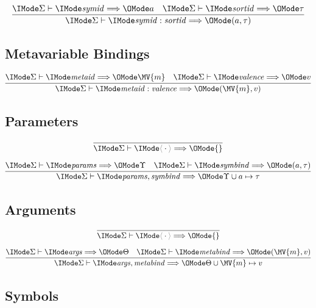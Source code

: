 \begin{gather}
  \infer{
    \Elab{\Sigma}{\ProdBind{\SortSymId}{\SortSortId}}{(a, \tau)}
  }{
    \Elab{\Sigma}{\SortSymId}{a} &
    \Elab{\Sigma}{\SortSortId}{\tau}
  }
\end{gather}

\subsection*{Metavariable Bindings\hfill {}}

\begin{gather}
  \infer{
    \Elab{\Sigma}{\ProdBind{\SortMetaId}{\SortValence}}{(\MV{m}, v)}
  }{
    \Elab{\Sigma}{\SortMetaId}{\MV{m}} &
    \Elab{\Sigma}{\SortValence}{v}
  }
\end{gather}

\subsection*{Parameters\hfill \framebox{$\Elab{\Sigma}{\SortParams}{\Upsilon}$}}

\begin{gather}
  \infer{
    \Elab{\Sigma}{\ProdEmptyCtx}{\{\}}
  }{
  }\\[6pt]
  \infer{
    \Elab{\Sigma}{\ProdExtendCtx{\SortParams}{\SortSymBind}}{
      \Upsilon\cup{a \mapsto\tau}
    }
  }{
    \Elab{\Sigma}{\SortParams}{\Upsilon} &
    \Elab{\Sigma}{\SortSymBind}{(a, \tau)}
  }
\end{gather}

\subsection*{Arguments\hfill \framebox{$\Elab{\Sigma}{\SortArgs}{\Theta}$}}

\begin{gather}
  \infer{
    \Elab{\Sigma}{\ProdEmptyCtx}{\{\}}
  }{
  }\\[6pt]
  \infer{
    \Elab{\Sigma}{\ProdExtendCtx{\SortArgs}{\SortMetaBind}}{
      \Theta\cup{\MV{m} \mapsto v}
    }
  }{
    \Elab{\Sigma}{\SortArgs}{\Theta} &
    \Elab{\Sigma}{\SortMetaBind}{(\MV{m}, v)}
  }
\end{gather}

\subsection*{Symbols \hfill {}}

